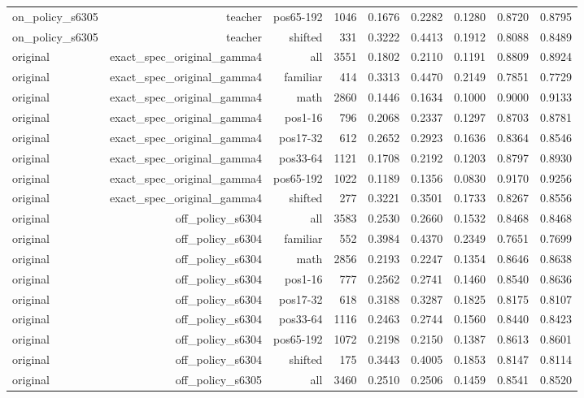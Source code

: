 \begin{tabular}{lrrrrrrrr}
on\_policy\_s6305 & teacher & pos65-192 & 1046 & 0.1676 & 0.2282 & 0.1280 & 0.8720 & 0.8795 \\
on\_policy\_s6305 & teacher & shifted & 331 & 0.3222 & 0.4413 & 0.1912 & 0.8088 & 0.8489 \\
original & exact\_spec\_original\_gamma4 & all & 3551 & 0.1802 & 0.2110 & 0.1191 & 0.8809 & 0.8924 \\
original & exact\_spec\_original\_gamma4 & familiar & 414 & 0.3313 & 0.4470 & 0.2149 & 0.7851 & 0.7729 \\
original & exact\_spec\_original\_gamma4 & math & 2860 & 0.1446 & 0.1634 & 0.1000 & 0.9000 & 0.9133 \\
original & exact\_spec\_original\_gamma4 & pos1-16 & 796 & 0.2068 & 0.2337 & 0.1297 & 0.8703 & 0.8781 \\
original & exact\_spec\_original\_gamma4 & pos17-32 & 612 & 0.2652 & 0.2923 & 0.1636 & 0.8364 & 0.8546 \\
original & exact\_spec\_original\_gamma4 & pos33-64 & 1121 & 0.1708 & 0.2192 & 0.1203 & 0.8797 & 0.8930 \\
original & exact\_spec\_original\_gamma4 & pos65-192 & 1022 & 0.1189 & 0.1356 & 0.0830 & 0.9170 & 0.9256 \\
original & exact\_spec\_original\_gamma4 & shifted & 277 & 0.3221 & 0.3501 & 0.1733 & 0.8267 & 0.8556 \\
original & off\_policy\_s6304 & all & 3583 & 0.2530 & 0.2660 & 0.1532 & 0.8468 & 0.8468 \\
original & off\_policy\_s6304 & familiar & 552 & 0.3984 & 0.4370 & 0.2349 & 0.7651 & 0.7699 \\
original & off\_policy\_s6304 & math & 2856 & 0.2193 & 0.2247 & 0.1354 & 0.8646 & 0.8638 \\
original & off\_policy\_s6304 & pos1-16 & 777 & 0.2562 & 0.2741 & 0.1460 & 0.8540 & 0.8636 \\
original & off\_policy\_s6304 & pos17-32 & 618 & 0.3188 & 0.3287 & 0.1825 & 0.8175 & 0.8107 \\
original & off\_policy\_s6304 & pos33-64 & 1116 & 0.2463 & 0.2744 & 0.1560 & 0.8440 & 0.8423 \\
original & off\_policy\_s6304 & pos65-192 & 1072 & 0.2198 & 0.2150 & 0.1387 & 0.8613 & 0.8601 \\
original & off\_policy\_s6304 & shifted & 175 & 0.3443 & 0.4005 & 0.1853 & 0.8147 & 0.8114 \\
original & off\_policy\_s6305 & all & 3460 & 0.2510 & 0.2506 & 0.1459 & 0.8541 & 0.8520 \\

\end{tabular}
